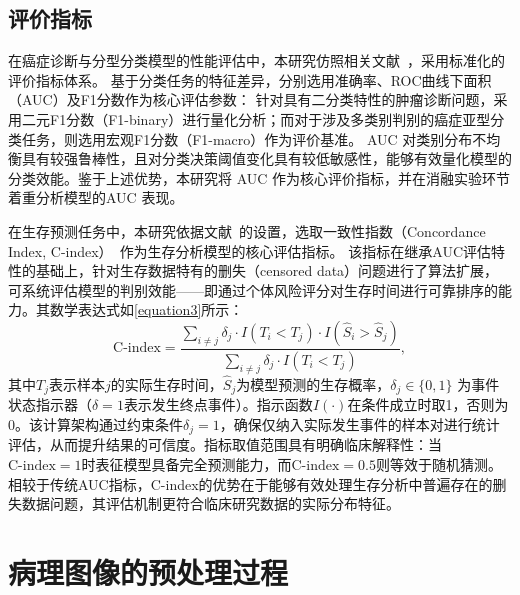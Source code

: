 \subsection[\hspace{-2pt}评价指标]{{\heiti{} \hspace{-8pt}评价指标}}\label{section2: 评价指标}

在癌症诊断与分型分类模型的性能评估中，本研究仿照相关文献~\cite{tang2024feature,tang2023multiple}，采用标准化的评价指标体系。
基于分类任务的特征差异，分别选用准确率、ROC曲线下面积（AUC）及F1分数作为核心评估参数：
针对具有二分类特性的肿瘤诊断问题，采用二元F1分数（F1-binary）进行量化分析；而对于涉及多类别判别的癌症亚型分类任务，则选用宏观F1分数（F1-macro）作为评价基准。
AUC 对类别分布不均衡具有较强鲁棒性，且对分类决策阈值变化具有较低敏感性，能够有效量化模型的分类效能。鉴于上述优势，本研究将 AUC 作为核心评价指标，并在消融实验环节着重分析模型的AUC 表现。

在生存预测任务中，本研究依据文献~\cite{yao2020whole,chen2021multimodal,zhou2023cross,wulczyn2020deep,zhu2017wsisa}的设置，选取一致性指数（Concordance Index, C-index）~\cite{harrell1996multivariable}作为生存分析模型的核心评估指标。
该指标在继承AUC评估特性的基础上，针对生存数据特有的删失（censored data）问题进行了算法扩展，可系统评估模型的判别效能——即通过个体风险评分对生存时间进行可靠排序的能力。其数学表达式如\ref{equation3}所示：
\begin{equation}
    \text{C-index} = \frac{
        \sum_{i \neq j} \delta_j \cdot I(T_i < T_j) \cdot I(\hat{S}_i > \hat{S}_j)
    }{
        \sum_{i \neq j} \delta_j \cdot I(T_i < T_j)
    },
    \label{equation3}
    \end{equation}
其中$T_j$表示样本$j$的实际生存时间，$\hat{S}_j$为模型预测的生存概率，${\delta}_j\in \{0,1\}$ 为事件状态指示器（$\delta=1$表示发生终点事件）。指示函数$I(\cdot)$在条件成立时取1，否则为0。该计算架构通过约束条件${\delta}_j=1$，确保仅纳入实际发生事件的样本对进行统计评估，从而提升结果的可信度。指标取值范围具有明确临床解释性：当 $\text{C-index}=1$时表征模型具备完全预测能力，而$ \text{C-index}=0.5$则等效于随机猜测。相较于传统AUC指标，C-index的优势在于能够有效处理生存分析中普遍存在的删失数据问题，其评估机制更符合临床研究数据的实际分布特征。

\section[\hspace{-2pt}病理图像的预处理过程]{{\heiti{} \hspace{-8pt}病理图像的预处理过程}}\label{section2: 病理图像的预处理过程}

